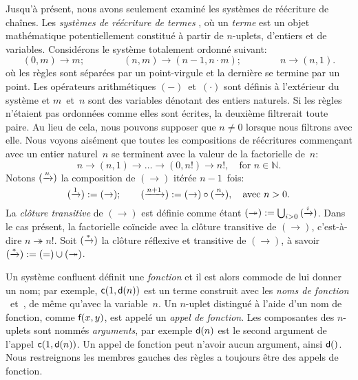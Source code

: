 Jusqu'à présent, nous avons seulement examiné les systèmes de
réécriture de chaînes. Les \emph{systèmes de réécriture de
  termes} \citep{BaaderNipkow_1998}, où
un \emph{terme} est un objet mathématique
potentiellement constitué à partir de \(n\)-uplets, d'entiers et de
variables. Considérons le système totalement ordonné suivant:
\begin{equation}
(0,m) \rightarrow m;\qquad\qquad
(n,m) \rightarrow (n-1,n \cdot m);\qquad\qquad
n     \rightarrow (n,1).
\label{eq:fact_tf}
\end{equation}
où les règles sont séparées par un point-virgule et la dernière
se termine par un point. Les opérateurs arithmétiques
\((-)\)~et~\((\cdot)\) sont définis à l'extérieur du système et
\(m\)~et~\(n\) sont des variables dénotant des entiers naturels. Si
les règles n'étaient pas ordonnées comme elles sont écrites, la
deuxième filtrerait toute paire. Au lieu de cela, nous pouvons
supposer que \(n \neq 0\) lorsque nous filtrons avec elle. Nous voyons
aisément que toutes les compositions de réécritures commençant avec un
entier naturel~\(n\) se terminent avec la valeur de la
factorielle de~\(n\):
\begin{equation*}
n \rightarrow (n,1) \rightarrow \dots \rightarrow (0,n!) \rightarrow
n!, \quad \text{for \(n \in \mathbb{N}\)}.
\end{equation*}
Notons \((\xrightarrow{\smash{n}})\) la composition de
\((\rightarrow)\) itérée \(n-1\)~fois:
\begin{equation*}
  (\xrightarrow{\smash{1}})   := (\rightarrow);\qquad
  (\xrightarrow{\smash{n+1}}) :=
     (\rightarrow) \circ (\xrightarrow{\smash{n}}),
\quad \text{avec \(n > 0\)}.
\end{equation*}
La \emph{clôture transitive}\label{transitive_closure} de \((\rightarrow)\) est
définie comme étant \((\twoheadrightarrow) := \bigcup_{i >
  0}{(\xrightarrow{\smash{i}})}\). Dans le cas présent, la
factorielle coïncide avec la clôture transitive de
\((\rightarrow)\), c'est-à-dire \(n \twoheadrightarrow n!\). Soit
\((\xrightarrow{\smash{*}})\) la clôture réflexive et transitive de
\((\rightarrow)\), à savoir \((\xrightarrow{\smash{*}}) := (=) \cup
(\twoheadrightarrow)\).

Un système confluent définit une \emph{fonction} et il est alors
commode de lui donner un nom; par exemple, \(\textsf{c}(1, \textsf{d}(n))\)
est un terme construit avec les \emph{noms de fonction}
~et~, de même qu'avec la variable~\(n\). Un \(n\)-uplet
distingué à l'aide d'un nom de fonction, comme \(\textsf{f}(x,y)\), est
appelé un \emph{appel de fonction}. Les composantes des \(n\)-uplets
sont nommés \emph{arguments}, par exemple \(\textsf{d}(n)\) est le second
argument de l'appel \(\textsf{c}(1, \textsf{d}(n))\). Un appel de fonction
peut n'avoir aucun argument, ainsi \(\textsf{d}()\). Nous restreignons
les membres gauches des règles a toujours être des appels de fonction.

